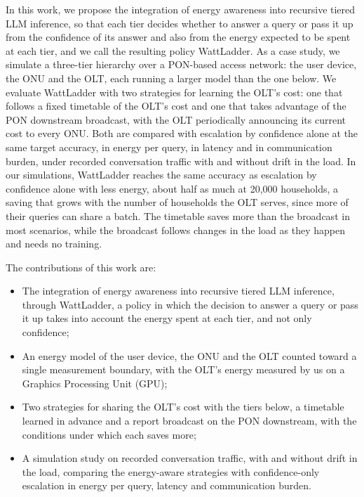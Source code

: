 \documentclass[cic,dipl,english]{infufrgs}
\begin{document}
In this work, we propose the integration of energy awareness into recursive tiered LLM
inference, so that each tier decides whether to answer a query or pass it up from the
confidence of its answer and also from the energy expected to be spent at each tier, and
we call the resulting policy WattLadder. As a case study, we simulate a three-tier
hierarchy over a PON-based access network: the user device, the ONU and the OLT, each running a
larger model than the one below. We evaluate WattLadder with two strategies for learning the
OLT's cost: one that
follows a fixed timetable of the OLT's cost and one that takes advantage of the PON
downstream broadcast, with the OLT periodically announcing its current cost to every
ONU. Both are compared with escalation by confidence alone at the same target accuracy, in energy per query,
in latency and in communication burden, under recorded conversation traffic with and without
drift in the load. In our simulations, WattLadder reaches the same accuracy as escalation by
confidence alone with less energy, about half as much at 20,000 households, a saving that grows
with the number of households the OLT serves, since more of their queries can share a batch. The timetable saves more than
the broadcast in most scenarios, while the broadcast follows changes in the load as they happen
and needs no training.

The contributions of this work are:
\begin{itemize}
  \item The integration of energy awareness into recursive tiered LLM inference, through
  WattLadder, a policy in which the decision to answer a query or pass it up takes into
  account the energy spent at each tier, and not only confidence;
  \item An energy model of the user device, the ONU and the OLT counted toward a single
  measurement boundary, with the OLT's energy measured by us on a Graphics Processing Unit (GPU);
  \item Two strategies for sharing the OLT's cost with the tiers below, a timetable learned
  in advance and a report broadcast on the PON downstream, with the conditions under which
  each saves more;
  \item A simulation study on recorded conversation traffic, with and without
  drift in the load, comparing the energy-aware strategies with confidence-only
  escalation in energy per query, latency and communication burden.
\end{itemize}
\end{document}
